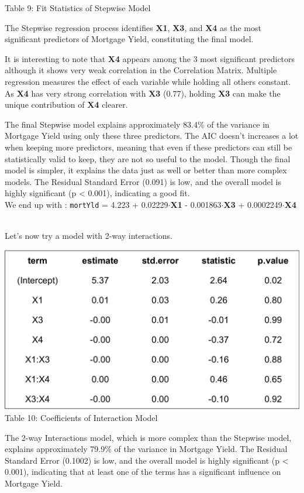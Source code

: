\documentclass[
  12pt,
]{article}
\begin{document}
\begin{center}
{\fontsize{12}{14}\selectfont Table 9: Fit Statistics of Stepwise Model\par}
\end{center}

The Stepwise regression process identifies \textbf{X1}, \textbf{X3}, and
\textbf{X4} as the most significant predictors of Mortgage Yield,
constituting the final model.

It is interesting to note that \textbf{X4} appears among the 3 most
significant predictors although it shows very weak correlation in the
Correlation Matrix. Multiple regression measures the effect of each
variable while holding all others constant. As \textbf{X4} has very
strong correlation with \textbf{X3} (0.77), holding \textbf{X3} can make
the unique contribution of \textbf{X4} clearer.

The final Stepwise model explains approximately 83.4\% of the variance
in Mortgage Yield using only these three predictors. The AIC doesn't
increases a lot when keeping more predictors, meaning that even if these
predictors can still be statistically valid to keep, they are not so
useful to the model. Though the final model is simpler, it explains the
data just as well or better than more complex models. The Residual
Standard Error (0.091) is low, and the overall model is highly
significant (p \textless{} 0.001), indicating a good fit.\\
We end up with : \texttt{mortYld} = 4.223 + 0.02229\(\cdot\)\textbf{X1}
- 0.001863\(\cdot\)\textbf{X3} + 0.0002249\(\cdot\)\textbf{X4}\\
\strut \\
Let's now try a model with 2-way interactions.

\begin{minipage}{0.4\textwidth}
\includegraphics[width=1.5\linewidth]{figures/interaction_model_coef.png}
\vspace{-0.3em}
\fontsize{12}{14}\selectfont Table 10: Coefficients of Interaction Model\par
\end{minipage}
\hfill
\begin{minipage}{0.35\textwidth}
The 2-way Interactions model, which is more complex than the Stepwise
model, explains approximately 79.9\% of the variance in Mortgage Yield.
The Residual Standard Error (0.1002) is low, and the overall model is
highly significant (p < 0.001), indicating that at least one of the
terms has a significant influence on Mortgage Yield.
\end{minipage}
\end{document}
